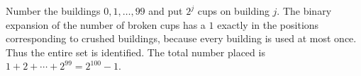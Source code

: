 Number the buildings $0,1,\ldots,99$ and put $2^j$ cups on building $j$. The binary expansion of the number of broken cups has a $1$ exactly in the positions corresponding to crushed buildings, because every building is used at most once. Thus the entire set is identified. The total number placed is $1+2+\cdots+2^{99}=\boxed{2^{100}-1}$.
